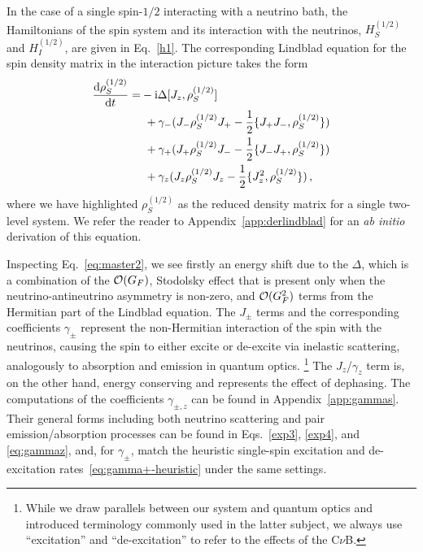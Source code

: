 \documentclass[aps,prd,10pt,twocolumn,superscriptaddress,floatfix,nofootinbib,amsmath,amssymb,altaffilletter,preprintnumbers]{revtex4-1}
\begin{document}
In the case of a single spin-$1/2$ interacting with a neutrino bath, the Hamiltonians of the spin system and its interaction with the neutrinos, $H_S^{(1/2)}$ and $H_I^{(1/2)}$, are given in Eq.~\eqref{h1}.  The corresponding Lindblad equation for the spin density matrix in the interaction picture takes the form
\begin{equation}
\begin{aligned}
\frac{{\rm d} \rho_S^{(1/2)}}{{\rm d} t} =& -{\rm i}\Delta[J_z, \rho^{(1/2)}_S]  \\
&~+ \gamma_{-}(J_- \rho^{(1/2)}_S J_+ - \frac{1}{2} \{J_+ J_-,\rho^{(1/2)}_S\} ) \\
&~+\gamma_{+}(J_+ \rho^{(1/2)}_S J_- - \frac{1}{2} \{J_- J_+,\rho^{(1/2)}_S\} ) \\
&~+\gamma_{z}(J_z \rho^{(1/2)}_S J_z - \frac{1}{2} \{J_z^2,\rho^{(1/2)}_S\})\,,
\label{eq:master2}
\end{aligned} 
\end{equation} where we have highlighted $\rho^{(1/2)}_S$ as the reduced density matrix for a single two-level system. We refer the reader to Appendix~\ref{app:derlindblad} for an {\it ab initio} derivation of this equation.

Inspecting Eq.~\eqref{eq:master2}, we see firstly an energy shift due to the $\Delta$, which is a combination of the ${\cal O}(G_F)$, Stodolsky effect that is present only when the neutrino-antineutrino asymmetry is non-zero, and ${\cal O}(G^2_F)$ terms from the Hermitian part of the Lindblad equation.  The $J_{\pm}$ terms and the corresponding coefficients $\gamma_\pm$ 
represent the non-Hermitian interaction of the spin with the neutrinos, causing the spin to either excite or de-excite via inelastic scattering, analogously to absorption and emission  in quantum optics.%
%
\footnote{While we draw parallels between our system and quantum optics and introduced terminology commonly used in the latter subject, we always use ``excitation'' and ``de-excitation'' to refer to the effects of the C$\nu$B.}
%
The $J_z$/$\gamma_z$ term is, on the other hand, energy conserving and represents the effect of dephasing. 
The computations of the coefficients $\gamma_{\pm,z}$ can be found in Appendix~\ref{app:gammas}. Their general forms including both neutrino scattering and pair emission/absorption processes can be found in Eqs.~\eqref{exp3}, \eqref{exp4}, and \eqref{eq:gammaz}, and, for $\gamma_\pm$, match the heuristic single-spin excitation and de-excitation rates~\eqref{eq:gamma+-heuristic} under the same settings.
\end{document}
